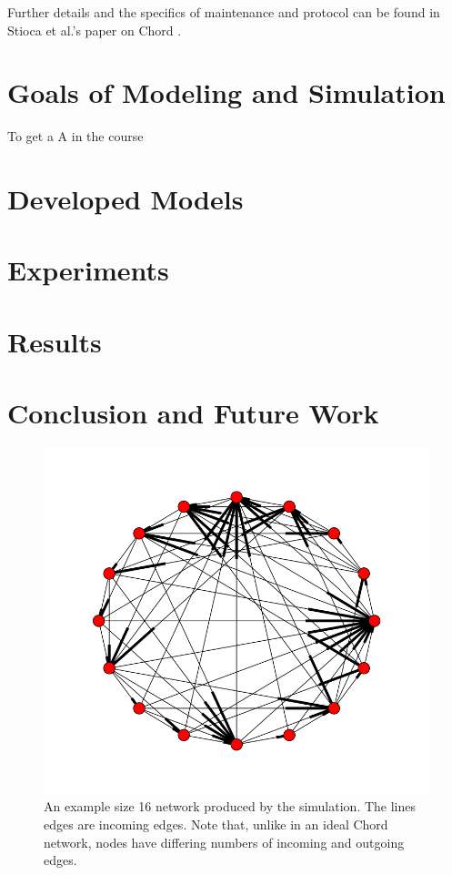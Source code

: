 \documentclass[12pt]{article} %
\begin{document}
Further details and the specifics of maintenance and protocol can be found in Stioca et al.'s paper on Chord \cite{Chord}.


\section{Goals of Modeling and Simulation}
To get a A in the course

\section{Developed Models}


\section{Experiments}

\section{Results}

\section{Conclusion and Future Work}



\begin{figure}
\includegraphics[width=\linewidth]{chordreal}
\caption{An example size 16 network produced by the simulation.  The lines edges are incoming edges.  Note that, unlike in an ideal Chord network, nodes have differing numbers of incoming and outgoing edges.}
\label{chordreal}
\end{figure}








\end{document}
